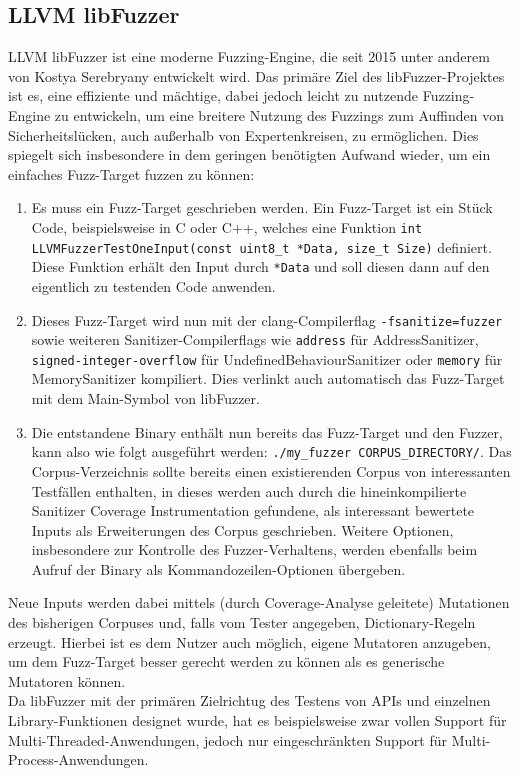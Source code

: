\documentclass[a4paper]{article}
\begin{document}
\subsection{LLVM libFuzzer}
LLVM libFuzzer\cite{libfuzzer} ist eine moderne Fuzzing-Engine, die seit 2015 unter anderem von Kostya Serebryany entwickelt wird\cite{newlibfuzzer}. 
Das primäre Ziel des libFuzzer-Projektes ist es, eine effiziente und mächtige, dabei jedoch leicht zu nutzende Fuzzing-Engine zu entwickeln, um eine breitere Nutzung des Fuzzings zum Auffinden von Sicherheitslücken, auch außerhalb von Expertenkreisen, zu ermöglichen. 
Dies spiegelt sich insbesondere in dem geringen benötigten Aufwand wieder, um ein einfaches Fuzz-Target fuzzen zu können:
\begin{enumerate}
    \item Es muss ein Fuzz-Target geschrieben werden. Ein Fuzz-Target ist ein Stück Code, beispielsweise in C oder C++, welches eine Funktion \texttt{int LLVMFuzzerTestOneInput(const uint8\_t *Data, size\_t Size)} definiert. Diese Funktion erhält den Input durch \texttt{*Data} und soll diesen dann auf den eigentlich zu testenden Code anwenden.
    \item Dieses Fuzz-Target wird nun mit der clang-Compilerflag \texttt{-fsanitize=fuzzer} sowie weiteren Sanitizer-Compilerflags wie \texttt{address} für AddressSanitizer, \texttt{signed-integer-overflow} für UndefinedBehaviourSanitizer oder \texttt{memory} für MemorySanitizer kompiliert.
        Dies verlinkt auch automatisch das Fuzz-Target mit dem Main-Symbol von libFuzzer.
    \item Die entstandene Binary enthält nun bereits das Fuzz-Target und den Fuzzer, kann also wie folgt ausgeführt werden: \texttt{./my\_fuzzer CORPUS\_DIRECTORY/}. Das Corpus-Verzeichnis sollte bereits einen existierenden Corpus von interessanten Testfällen enthalten, in dieses werden auch durch die hineinkompilierte Sanitizer Coverage Instrumentation\cite{newlibfuzzer} gefundene, als interessant bewertete Inputs als Erweiterungen des Corpus geschrieben.
        Weitere Optionen, insbesondere zur Kontrolle des Fuzzer-Verhaltens, werden ebenfalls beim Aufruf der Binary als Kommandozeilen-Optionen übergeben.
\end{enumerate}
Neue Inputs werden dabei mittels (durch Coverage-Analyse geleitete) Mutationen des bisherigen Corpuses und, falls vom Tester angegeben, Dictionary-Regeln erzeugt. 
Hierbei ist es dem Nutzer auch möglich, eigene Mutatoren anzugeben, um dem Fuzz-Target besser gerecht werden zu können als es generische Mutatoren können.\\
Da libFuzzer mit der primären Zielrichtug des Testens von APIs und einzelnen Library-Funktionen designet wurde, hat es beispielsweise zwar vollen Support für Multi-Threaded-Anwendungen, jedoch nur eingeschränkten Support für Multi-Process-Anwendungen.
\end{document}

